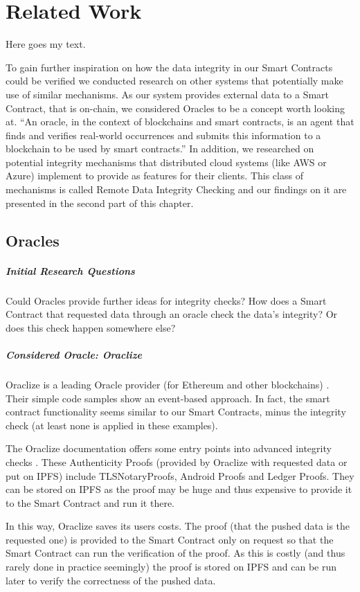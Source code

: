 \section{Related Work}

Here goes my text.

To gain further inspiration on how the data integrity in our Smart Contracts could be verified we conducted research on other systems that potentially make use of similar mechanisms. As our system provides external data to a Smart Contract, that is on-chain, we considered Oracles to be a concept worth looking at. “An oracle, in the context of blockchains and smart contracts, is an agent that finds and verifies real-world occurrences and submits this information to a blockchain to be used by smart contracts.” \cite{relatedWork01} In addition, we researched on potential integrity mechanisms that distributed cloud systems (like AWS or Azure) implement to provide as features for their clients. This class of mechanisms is called Remote Data Integrity Checking and our findings on it are presented in the second part of this chapter.

\subsection{Oracles}

\subparagraph{Initial Research Questions}
Could Oracles provide further ideas for integrity checks? How does a Smart Contract that requested data through an oracle check the data’s integrity? Or does this check happen somewhere else?

\subparagraph{Considered Oracle: Oraclize}
Oraclize is a leading Oracle provider (for Ethereum and other blockchains) \cite{relatedWork02}. Their simple code samples \cite{relatedWork03} show an event-based approach. In fact, the smart contract functionality seems similar to our Smart Contracts, minus the integrity check (at least none is applied in these examples).

The Oraclize documentation offers some entry points into advanced integrity checks \cite{relatedWork04}. These Authenticity Proofs (provided by Oraclize with requested data or put on IPFS) \cite{relatedWork05} include TLSNotaryProofs, Android Proofs and Ledger Proofs. They can be stored on IPFS as the proof may be huge and thus expensive to provide it to the Smart Contract and run it there. \cite{relatedWork06}

In this way, Oraclize saves its users costs. The proof (that the pushed data is the requested one) is provided to the Smart Contract only on request so that the Smart Contract can run the verification of the proof. As this is costly (and thus rarely done in practice seemingly) the proof is stored on IPFS and can be run later to verify the correctness of the pushed data.

